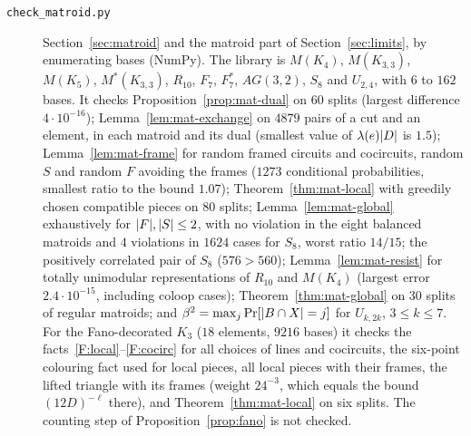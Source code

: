 \begin{description}
\item[\texttt{check\_matroid.py}] Section~\ref{sec:matroid} and the matroid part of Section~\ref{sec:limits}, by enumerating bases (NumPy). The library is $M(K_4)$, $M(K_{3,3})$, $M(K_5)$, $M^*(K_{3,3})$, $R_{10}$, $F_7$, $F_7^*$, $AG(3,2)$, $S_8$ and $U_{2,4}$, with $6$ to $162$ bases. It checks Proposition~\ref{prop:mat-dual} on $60$ splits (largest difference $4\cdot10^{-16}$); Lemma~\ref{lem:mat-exchange} on $4879$ pairs of a cut and an element, in each matroid and its dual (smallest value of $\lambda(e)\lvert D\rvert$ is $1.5$); Lemma~\ref{lem:mat-frame} for random framed circuits and cocircuits, random $S$ and random $F$ avoiding the frames ($1273$ conditional probabilities, smallest ratio to the bound $1.07$); Theorem~\ref{thm:mat-local} with greedily chosen compatible pieces on $80$ splits; Lemma~\ref{lem:mat-global} exhaustively for $\lvert F\rvert,\lvert S\rvert\le2$, with no violation in the eight balanced matroids and $4$ violations in $1624$ cases for $S_8$, worst ratio $14/15$; the positively correlated pair of $S_8$ ($576>560$); Lemma~\ref{lem:mat-resist} for totally unimodular representations of $R_{10}$ and $M(K_4)$ (largest error $2.4\cdot10^{-15}$, including coloop cases); Theorem~\ref{thm:mat-global} on $30$ splits of regular matroids; and $\beta^2=\max_j\Pr[\lvert B\cap X\rvert=j]$ for $U_{k,2k}$, $3\le k\le7$. For the Fano-decorated $K_3$ ($18$ elements, $9216$ bases) it checks the facts~\ref{F:local}--\ref{F:cocirc} for all choices of lines and cocircuits, the six-point colouring fact used for local pieces, all local pieces with their frames, the lifted triangle with its frames (weight $24^{-3}$, which equals the bound $(12D)^{-\ell}$ there), and Theorem~\ref{thm:mat-local} on six splits. The counting step of Proposition~\ref{prop:fano} is not checked.

\end{description}
